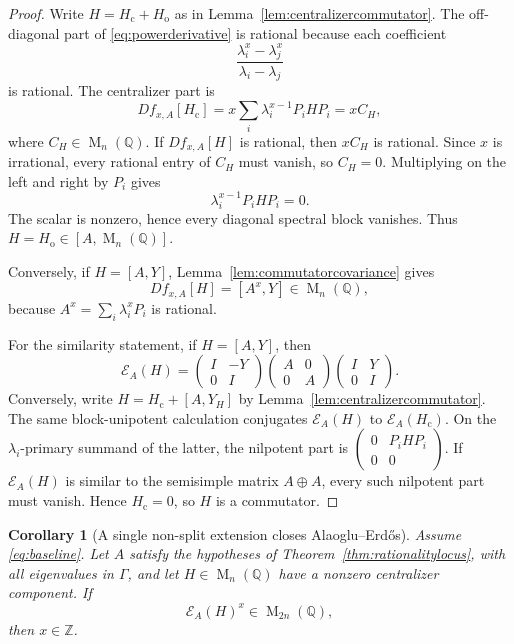 \documentclass[11pt,oneside]{article}
\newtheorem{corollary}[theorem]{Corollary}
\theoremstyle{definition}
\theoremstyle{remark}
\newcommand{\Z}{\mathbb Z}
\newcommand{\Q}{\mathbb Q}
\newcommand{\Mat}{\operatorname{M}}
\newcommand{\cE}{\mathcal E}
\newcommand{\AEname}{Alaoglu--Erd\H{o}s}
\begin{document}
\begin{proof}
Write $H=H_{\mathrm c}+H_{\mathrm o}$ as in
Lemma~\ref{lem:centralizercommutator}.  The off-diagonal part of
\eqref{eq:powerderivative} is rational because each coefficient
\[
 \frac{\lambda_i^x-\lambda_j^x}{\lambda_i-\lambda_j}
\]
is rational.  The centralizer part is
\begin{equation}
 Df_{x,A}[H_{\mathrm c}]
 =x\sum_i\lambda_i^{x-1}P_iHP_i
 =xC_H,
 \label{eq:xCH}
\end{equation}
where $C_H\in\Mat_n(\Q)$.  If $Df_{x,A}[H]$ is rational, then $xC_H$ is rational.
Since $x$ is irrational, every rational entry of $C_H$ must vanish, so $C_H=0$.  Multiplying
on the left and right by $P_i$ gives
\[
 \lambda_i^{x-1}P_iHP_i=0.
\]
The scalar is nonzero, hence every diagonal spectral block vanishes.  Thus
$H=H_{\mathrm o}\in[A,\Mat_n(\Q)]$.

Conversely, if $H=[A,Y]$, Lemma~\ref{lem:commutatorcovariance} gives
\[
 Df_{x,A}[H]=[A^x,Y]\in\Mat_n(\Q),
\]
because $A^x=\sum_i\lambda_i^xP_i$ is rational.

For the similarity statement, if $H=[A,Y]$, then
\begin{equation}
 \cE_A(H)=
 \begin{pmatrix}I&-Y\\0&I\end{pmatrix}
 \begin{pmatrix}A&0\\0&A\end{pmatrix}
 \begin{pmatrix}I&Y\\0&I\end{pmatrix}.
 \label{eq:splitsimilarity}
\end{equation}
Conversely, write $H=H_{\mathrm c}+[A,Y_H]$ by
Lemma~\ref{lem:centralizercommutator}.  The same block-unipotent calculation conjugates
$\cE_A(H)$ to $\cE_A(H_{\mathrm c})$.  On the $\lambda_i$-primary summand of the latter, the
nilpotent part is
$\left(\begin{smallmatrix}0&P_iHP_i\\0&0\end{smallmatrix}\right)$.  If $\cE_A(H)$ is similar
to the semisimple matrix $A\oplus A$, every such nilpotent part must vanish.  Hence
$H_{\mathrm c}=0$, so $H$ is a commutator.
\end{proof}

\begin{corollary}[A single non-split extension closes \AEname{}]
\label{cor:oneselfextension}
Assume \eqref{eq:baseline}.  Let $A$ satisfy the hypotheses of
Theorem~\ref{thm:rationalitylocus}, with all eigenvalues in $\Gamma$, and let
$H\in\Mat_n(\Q)$ have a nonzero centralizer component.  If
\[
 \cE_A(H)^x\in\Mat_{2n}(\Q),
\]
then $x\in\Z$.
\end{corollary}
\end{document}
